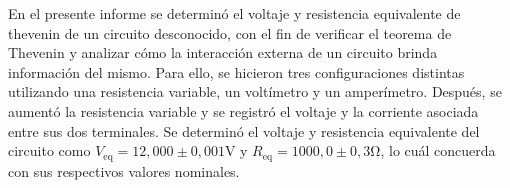 En el presente informe se determinó el voltaje y resistencia equivalente de thevenin
de un circuito desconocido, con el fin de verificar el teorema de Thevenin y analizar
cómo la interacción externa de un circuito brinda información del mismo. Para ello,
se hicieron tres configuraciones distintas utilizando una resistencia variable, un
voltímetro y un amperímetro. Después, se aumentó la resistencia variable y se registró
el voltaje y la corriente asociada entre sus dos terminales. Se determinó el voltaje
y resistencia equivalente del circuito como $V_\mathrm{eq}=12,000\pm0,001\unit{\volt}$
y $R_\mathrm{eq}=1000,0\pm0,3\unit{\ohm}$, lo cuál concuerda con sus respectivos valores
nominales.